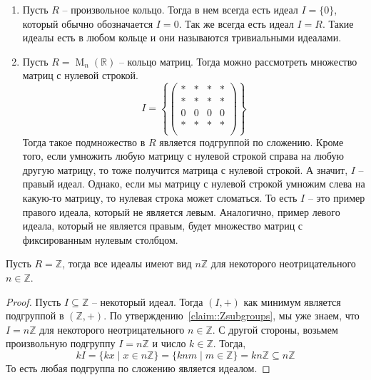 \begin{examples}
\begin{enumerate}
\item Пусть $R$ -- произвольное кольцо.
Тогда в нем всегда есть идеал $I = \{0\}$, который	 обычно обозначается $I = 0$.
Так же всегда есть идеал $I = R$.
Такие идеалы есть в любом кольце и они называются тривиальными идеалами.

\item Пусть $R = \operatorname{M}_n(\mathbb R)$ -- кольцо матриц.
Тогда можно рассмотреть множество матриц с нулевой строкой.
\[
I =
\left\{
\begin{pmatrix}
{*}&{*}&{*}&{*}\\
{*}&{*}&{*}&{*}\\
{0}&{0}&{0}&{0}\\
{*}&{*}&{*}&{*}\\
\end{pmatrix}
\right\}
\]
Тогда такое подмножество в $R$ является подгруппой по сложению.
Кроме того, если умножить любую матрицу с нулевой строкой справа на любую другую матрицу, то тоже получится матрица с нулевой строкой.
А значит, $I$ -- правый идеал.
Однако, если мы матрицу с нулевой строкой умножим слева на какую-то матрицу, то нулевая строка может сломаться.
То есть $I$ -- это пример правого идеала, который не является левым.
Аналогично, пример левого идеала, который не является правым, будет множество матриц с фиксированным нулевым столбцом.
\end{enumerate}
\end{examples}


\begin{claim}
\label{claim::ZIdeals}
Пусть $R = \mathbb Z$, тогда все идеалы имеют вид $n\mathbb Z$ для некоторого неотрицательного $n\in \mathbb Z$.
\end{claim}
\begin{proof}
Пусть $I\subseteq \mathbb Z$ -- некоторый идеал.
Тогда $(I, +)$ как минимум является подгруппой в $(\mathbb Z, +)$.
По утверждению~\ref{claim::Zsubgroups}, мы уже знаем, что $I = n\mathbb Z$ для некоторого неотрицательного $n\in \mathbb Z$.
С другой стороны, возьмем произвольную подгруппу  $I = n\mathbb Z$ и число $k\in \mathbb Z$.
Тогда,
\[
k I = \{k x \mid x\in n\mathbb Z\} = \{kn m\mid m\in \mathbb Z\} = kn\mathbb Z\subseteq n\mathbb Z
\]
То есть любая подгруппа по сложению является идеалом.
\end{proof}


